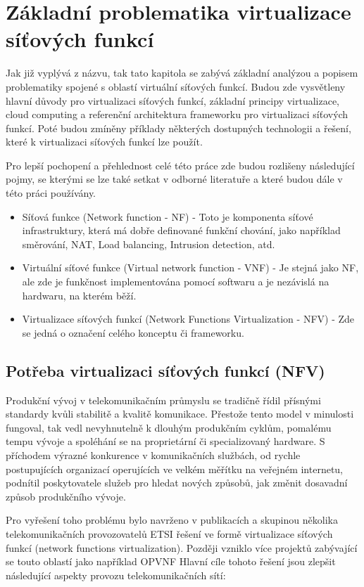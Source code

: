 \chapter{Základní problematika virtualizace síťových funkcí}
Jak již vyplývá z názvu, tak tato kapitola se zabývá základní analýzou a popisem problematiky spojené s oblastí virtuální síťových funkcí. Budou zde vysvětleny hlavní důvody pro virtualizaci síťových funkcí, základní principy virtualizace, cloud computing a referenční architektura frameworku pro virtualizaci síťových funkcí. Poté budou zmíněny příklady některých dostupných technologii a řešení, které k virtualizaci síťových funkcí lze použít.

Pro lepší pochopení a přehlednost celé této práce zde budou rozlišeny následující pojmy, se kterými se lze také setkat v odborné literatuře a které budou dále v této práci používány. 

\begin{itemize}
\item Síťová funkce (Network function - NF) - Toto je komponenta síťové infrastruktury, která má dobře definované funkční chování, jako například směrování, NAT, Load balancing, Intrusion detection, atd.
\item Virtuální síťové funkce (Virtual network function - VNF) - Je stejná jako NF, ale zde je funkčnost implementována pomocí softwaru a je nezávislá na hardwaru, na kterém běží.
\item Virtualizace síťových funkcí (Network Functions Virtualization - NFV) - Zde se jedná o označení celého konceptu či frameworku.
\end{itemize}

\section{Potřeba virtualizaci síťových funkcí (NFV)}

Produkční vývoj v telekomunikačním průmyslu se tradičně řídil přísnými standardy kvůli stabilitě a kvalitě komunikace. Přestože tento model v minulosti fungoval, tak vedl nevyhnutelně k dlouhým produkčním cyklům, pomalému tempu vývoje a spoléhání se na proprietární či specializovaný hardware. S příchodem výrazné konkurence v komunikačních službách, od rychle postupujících organizací operujících ve velkém měřítku na veřejném internetu, podnítil poskytovatele služeb pro hledat nových způsobů, jak změnit dosavadní způsob produkčního vývoje.

Pro vyřešení toho problému bylo navrženo v publikacích \cite{NFV_paper2012} a \cite{NFV_paper2013} skupinou několika telekomunikačních provozovatelů ETSI řešení ve formě virtualizace síťových funkcí (network functions virtualization). Později vzniklo více projektů zabývající se touto oblastí jako například OPVNF \cite{OPNFV}  Hlavní cíle tohoto řešení jsou zlepšit následující aspekty provozu telekomunikačních sítí:

